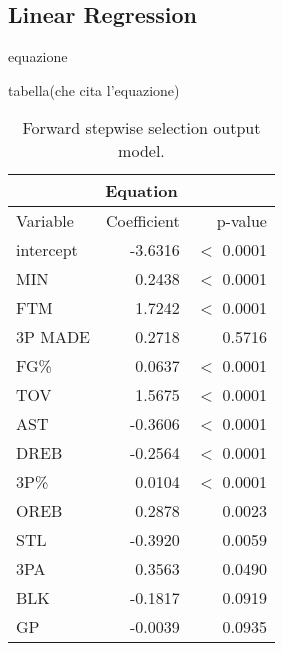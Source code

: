 \subsection*{Linear Regression}\label{appendix:lr}
equazione

tabella(che cita l'equazione)
\begin{table}[H]
	\centering
	\begin{tabular}{|| l | r | r ||} 
		\hline
		\multicolumn{3}{|c|}{Equation} \\
		\hline
		Variable & Coefficient & p-value \\
		\hline
		intercept & -3.6316 & $<$ 0.0001 \\
		MIN & 0.2438 & $<$ 0.0001 \\
		FTM & 1.7242 & $<$ 0.0001 \\
		3P MADE & 0.2718 & 0.5716 \\
		FG\% & 0.0637 & $<$ 0.0001 \\
		TOV & 1.5675 & $<$ 0.0001 \\
		AST & -0.3606 & $<$ 0.0001 \\
		DREB & -0.2564 & $<$ 0.0001 \\
		3P\% & 0.0104 & $<$ 0.0001 \\
		OREB & 0.2878 & 0.0023 \\
		STL & -0.3920 & 0.0059 \\
		3PA & 0.3563 & 0.0490 \\
		BLK & -0.1817 & 0.0919 \\
		GP & -0.0039 & 0.0935 \\
		\hline
	\end{tabular}
	\caption{Forward stepwise selection output model.}
	\label{table:ForwardModelSummary}
\end{table}


